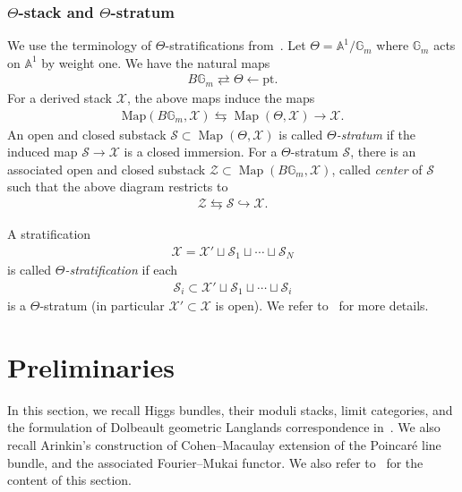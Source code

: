 \documentclass[11pt,oneside,a4paper,mathscr]{amsart}
\theoremstyle{definition}
\newcommand{\cS}{\mathcal{S}}
\newcommand{\X}{\mathcal{X}}
\newcommand{\bgm}{B\mathbb{G}_m}
\newcommand{\Map}{\operatorname{Map}}
\begin{document}
\subsubsection*{$\Theta$-stack and $\Theta$-stratum}
We use the terminology of $\Theta$-stratifications from~\cite{Halpinstab}. 
Let $\Theta=\mathbb{A}^1/\mathbb{G}_m$ where $\mathbb{G}_m$ acts on $\mathbb{A}^1$ by weight one. 
We have the natural maps 
\begin{align*}
    \bgm \rightleftarrows\Theta \leftarrow \mathrm{pt}.
\end{align*}
For a derived stack $\X$, the above maps induce the maps 
\begin{align*}
    \mathrm{Map}(\bgm, \X) \leftrightarrows \Map(\Theta, \X) \to \X.
\end{align*}
An open and closed substack $\cS \subset \Map(\Theta, \X)$ is called \textit{$\Theta$-stratum} if the induced map 
$\cS \to \X$ is a closed immersion. 
For a $\Theta$-stratum $\cS$, there is an associated 
open and closed substack $\mathcal{Z}\subset \Map(\bgm, \X)$, called 
\textit{center} of $\cS$ such that the above diagram restricts to 
\begin{align*}
    \mathcal{Z} \leftrightarrows \mathcal{S} \hookrightarrow \X. 
\end{align*}

A stratification 
\begin{align*}
    \X=\X' \sqcup \cS_1 \sqcup \cdots \sqcup \cS_N
\end{align*}
is called \textit{$\Theta$-stratification} if each 
\begin{align*}
    \cS_i \subset \X' \sqcup \cS_1 \sqcup \cdots \sqcup \cS_i
\end{align*}
is a $\Theta$-stratum (in particular $\X'\subset \X$ is open). We refer to~\cite{Halpinstab} for more details. 


\section{Preliminaries}
In this section, we recall Higgs bundles, their moduli stacks, limit categories, 
and the formulation of Dolbeault geometric Langlands correspondence in~\cite{PTlim}. 
We also recall Arinkin's construction of Cohen--Macaulay extension of the Poincar\'e line bundle, 
and the associated Fourier--Mukai functor. We also refer to~\cite[Section~2]{TodaGL2} for the content 
of this section. 
\end{document}
